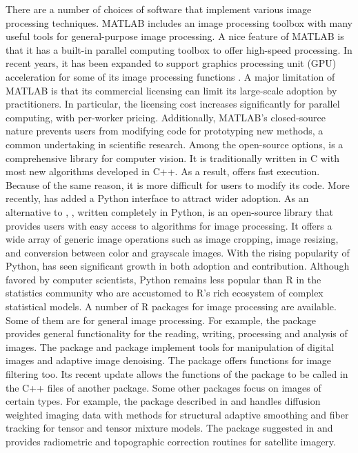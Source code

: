 There are a number of choices of software that implement various image processing techniques. MATLAB \citep{MATLAB} includes an image processing toolbox with many useful tools for general-purpose image processing. A nice feature of MATLAB is that it has a built-in parallel computing toolbox to offer high-speed processing. In recent years, it has been expanded to support graphics processing unit (GPU) acceleration for some of its image processing functions \citep{georgantzoglou2014image}. A major limitation of MATLAB is that its commercial licensing can limit its large-scale adoption by practitioners. In particular, the licensing cost increases significantly for parallel computing, with per-worker pricing. Additionally, MATLAB's closed-source nature prevents users from modifying code for prototyping new methods, a common undertaking in scientific research. Among the open-source options,  \citep{bradski2008learning} is a comprehensive library for computer vision. It is traditionally written in C with most new algorithms developed in C++. As a result,  offers fast execution. Because of the same reason, it is more difficult for users to modify its code. More recently,  has added a Python interface to attract wider adoption. As an alternative to ,  \citep{van2014scikit}, written completely in Python, is an open-source library that provides users with easy access to algorithms for image processing. It offers a wide array of generic image operations such as image cropping, image resizing, and conversion between color and grayscale images. With the rising popularity of Python,  has seen significant growth in both adoption and contribution. Although favored by computer scientists, Python remains less popular than R \citep{R} in the statistics community who are accustomed to R's rich ecosystem of complex statistical models. A number of R packages for image processing are available. Some of them are for general image processing. For example, the  package \citep{pau2010ebimage} provides general functionality for the reading, writing, processing and analysis of images. The  package \citep{polzehl2007adaptive} and  package \citep{polzehl2023magnetic, polzehl2020patch} implement tools for manipulation of digital images and adaptive image denoising. The  package \citep{OpenImageR2023} offers functions for image filtering too. Its recent update allows the  functions of the  package to be called in the C++ files of another package. Some other packages focus on images of certain types. For example, the  package described in \citet{karsten2008diffusion} and \citet{karsten2011beyond} handles diffusion weighted imaging data with methods for structural adaptive smoothing and fiber tracking for tensor and tensor mixture models. The  package suggested in \citet{goslee2023landsat} and \citet{goslee2011analyzing} provides radiometric and topographic correction routines for satellite imagery.

